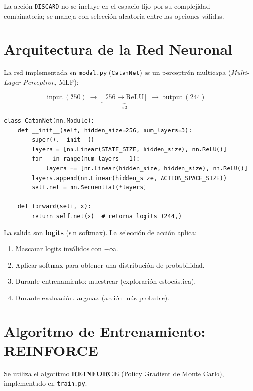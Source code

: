 \documentclass[11pt, a4paper]{article}
\begin{document}
La acción \texttt{DISCARD} no se incluye en el espacio fijo por su complejidad
combinatoria; se maneja con selección aleatoria entre las opciones válidas.


\section{Arquitectura de la Red Neuronal}

La red implementada en \texttt{model.py} (\texttt{CatanNet}) es un perceptrón
multicapa (\textit{Multi-Layer Perceptron}, MLP):

\[
  \text{input}\ (250) \;\to\; \underbrace{[256 \to \text{ReLU}]}_{\times 3} \;\to\; \text{output}\ (244)
\]

\begin{lstlisting}[caption={Definición de CatanNet en PyTorch}]
class CatanNet(nn.Module):
    def __init__(self, hidden_size=256, num_layers=3):
        super().__init__()
        layers = [nn.Linear(STATE_SIZE, hidden_size), nn.ReLU()]
        for _ in range(num_layers - 1):
            layers += [nn.Linear(hidden_size, hidden_size), nn.ReLU()]
        layers.append(nn.Linear(hidden_size, ACTION_SPACE_SIZE))
        self.net = nn.Sequential(*layers)

    def forward(self, x):
        return self.net(x)  # retorna logits (244,)
\end{lstlisting}

La salida son \textbf{logits} (sin softmax). La selección de acción aplica:
\begin{enumerate}
  \item Mascarar logits inválidos con $-\infty$.
  \item Aplicar softmax para obtener una distribución de probabilidad.
  \item Durante entrenamiento: muestrear (exploración estocástica).
  \item Durante evaluación: argmax (acción más probable).
\end{enumerate}


\section{Algoritmo de Entrenamiento: REINFORCE}

Se utiliza el algoritmo \textbf{REINFORCE} (Policy Gradient de Monte Carlo),
implementado en \texttt{train.py}.
\end{document}
